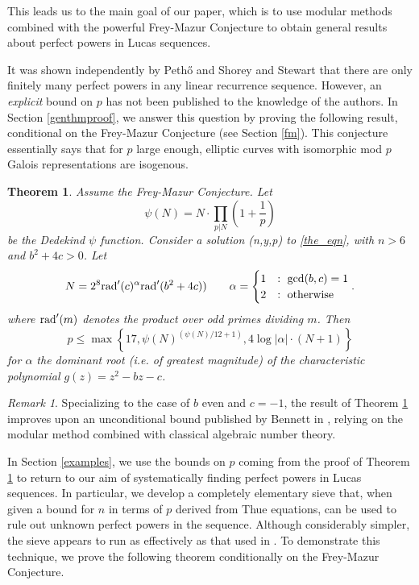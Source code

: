 \documentclass[12pt]{amsart}
\newtheorem{ithm}{Theorem}
\theoremstyle{definition}
\theoremstyle{remark}
\newtheorem*{rem}{Remark}
\newcommand{\rad}{{\rm{rad}}}
\begin{document}
This leads us to the main goal of our paper, which is to use modular methods combined with the powerful Frey-Mazur Conjecture to obtain general results about perfect powers in Lucas sequences.

It was shown independently by Peth{\H{o}} \cite{petho82} and Shorey and Stewart \cite{shorey83} that there are only finitely many perfect powers in any linear recurrence sequence.  However, an \emph{explicit} bound on $p$ has not been published to the knowledge of the authors.  In Section \ref{genthmproof}, we answer this question by proving the following result, conditional on the Frey-Mazur Conjecture (see Section \ref{fm}).  This conjecture essentially says that for $p$ large enough, elliptic curves with isomorphic mod $p$ Galois representations are isogenous. 


\begin{ithm}\label{condbound}
Assume the Frey-Mazur Conjecture.  Let 
\[ \psi(N) = N \cdot \prod_{p|N} \left( 1 + \frac{1}{p} \right)\]
be the Dedekind $\psi$ function.  Consider a solution (n,y,p) to \eqref{the_eqn}, with $n > 6$ and $b^2+4c >0$. Let \[ N = 2^8  {\rad}'(c)^\alpha\rad'(b^2+4c)) \qquad \alpha = \begin{cases} 1 & : \ \gcd(b,c)=1 \\ 2 & : \ \text{otherwise} \end{cases}. \]
where $\rad'(m)$ denotes the product over odd primes dividing $m$. Then 
\[ p \leq \max\left\{17,   \psi(N)^{(\psi(N)/12+1)}, 4\log{|\alpha|} \cdot ( N+1)  \right\} \]
for $\alpha$ the dominant root (i.e. of greatest magnitude) of the characteristic polynomial $g(z) = z^2 -bz-c$.
\end{ithm}
\begin{rem}
Specializing to the case of $b$ even and $c = -1$, the result of Theorem \ref{condbound} improves upon an unconditional bound published by Bennett in \cite{bennett05}, relying on the modular method combined with classical algebraic number theory.
\end{rem}

In Section \ref{examples}, we use the bounds on $p$ coming from the proof of Theorem \ref{condbound} to return to our aim of systematically finding perfect powers in Lucas sequences.  In particular,  we develop a completely elementary sieve that, when given a bound for $n$ in terms of $p$ derived from Thue equations, can be used to rule out unknown perfect powers in the sequence.  Although considerably simpler, the sieve appears to run as effectively as that used in \cite{siksek06}. To demonstrate this technique, we prove the following theorem conditionally on the Frey-Mazur Conjecture.
\end{document}
